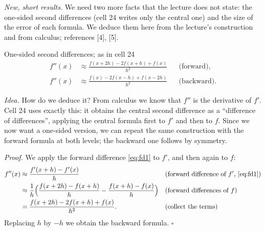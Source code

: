 \documentclass[11pt,a4paper]{article}
\begin{document}
\noindent\emph{New, short results.} We need two more facts that the lecture does not state: the one-sided second differences (cell 24 writes only the central one) and the size of the error of each formula. We deduce them here from the lecture's construction and from calculus; references [4], [5].

\begin{lembox}{One-sided second differences; as in cell 24}
\begin{equation}\label{eq:fd2side}
\begin{aligned}
f''(x)&\approx\frac{f(x+2h)-2f(x+h)+f(x)}{h^2} && \text{(forward)},\\
f''(x)&\approx\frac{f(x)-2f(x-h)+f(x-2h)}{h^2} && \text{(backward)}.
\end{aligned}
\end{equation}
\end{lembox}
\noindent\emph{Idea.} How do we deduce it? From calculus we know that $f''$ is the derivative of $f'$. Cell 24 uses exactly this: it obtains the central second difference as a ``difference of differences'', applying the central formula first to $f'$ and then to $f$. Since we now want a one-sided version, we can repeat the same construction with the forward formula at both levels; the backward one follows by symmetry.

\noindent\emph{Proof.} We apply the forward difference \eqref{eq:fd1} to $f'$, and then again to $f$:
\begin{align*}
f''(x)&\approx\frac{f'(x+h)-f'(x)}{h} && \text{(forward difference of $f'$, \eqref{eq:fd1})}\\
&\approx\frac{1}{h}\Bigl(\frac{f(x+2h)-f(x+h)}{h}-\frac{f(x+h)-f(x)}{h}\Bigr) && \text{(forward differences of $f$)}\\
&=\frac{f(x+2h)-2f(x+h)+f(x)}{h^2}. && \text{(collect the terms)}
\end{align*}
Replacing $h$ by $-h$ we obtain the backward formula. \hfill$\square$
\end{document}
